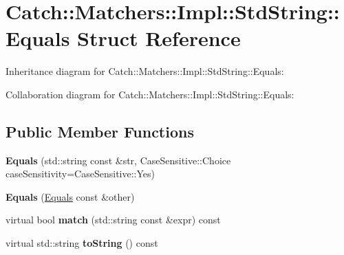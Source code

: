 \hypertarget{structCatch_1_1Matchers_1_1Impl_1_1StdString_1_1Equals}{}\section{Catch\+:\+:Matchers\+:\+:Impl\+:\+:Std\+String\+:\+:Equals Struct Reference}
\label{structCatch_1_1Matchers_1_1Impl_1_1StdString_1_1Equals}


Inheritance diagram for Catch\+:\+:Matchers\+:\+:Impl\+:\+:Std\+String\+:\+:Equals\+:


Collaboration diagram for Catch\+:\+:Matchers\+:\+:Impl\+:\+:Std\+String\+:\+:Equals\+:
\subsection*{Public Member Functions}
\begin{DoxyCompactItemize}
\item 
{\bfseries Equals} (std\+::string const \&str, Case\+Sensitive\+::\+Choice case\+Sensitivity=Case\+Sensitive\+::\+Yes)\hypertarget{structCatch_1_1Matchers_1_1Impl_1_1StdString_1_1Equals_a5921d5ed75320fb64a678e3f1292a464}{}\label{structCatch_1_1Matchers_1_1Impl_1_1StdString_1_1Equals_a5921d5ed75320fb64a678e3f1292a464}

\item 
{\bfseries Equals} (\hyperlink{structCatch_1_1Matchers_1_1Impl_1_1StdString_1_1Equals}{Equals} const \&other)\hypertarget{structCatch_1_1Matchers_1_1Impl_1_1StdString_1_1Equals_acaa97de06aedf363ae803d65a975f5e4}{}\label{structCatch_1_1Matchers_1_1Impl_1_1StdString_1_1Equals_acaa97de06aedf363ae803d65a975f5e4}

\item 
virtual bool {\bfseries match} (std\+::string const \&expr) const \hypertarget{structCatch_1_1Matchers_1_1Impl_1_1StdString_1_1Equals_a00c8259a76c24da669e116662ededc70}{}\label{structCatch_1_1Matchers_1_1Impl_1_1StdString_1_1Equals_a00c8259a76c24da669e116662ededc70}

\item 
virtual std\+::string {\bfseries to\+String} () const \hypertarget{structCatch_1_1Matchers_1_1Impl_1_1StdString_1_1Equals_a7a09449ff2f858981caf3b1f6c36d270}{}\label{structCatch_1_1Matchers_1_1Impl_1_1StdString_1_1Equals_a7a09449ff2f858981caf3b1f6c36d270}

\end{DoxyCompactItemize}

